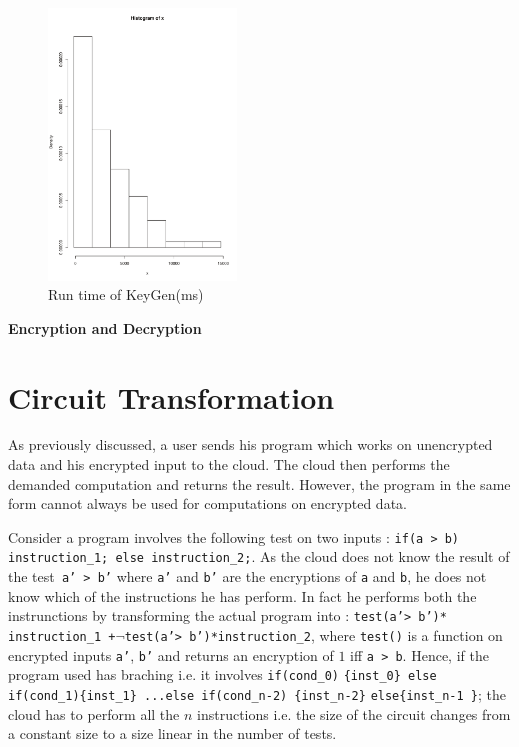 \documentclass{acm_proc_article-sp}
\begin{document}
\begin{figure}[!h] %
\centering
\includegraphics[width=5cm]{f3.pdf} 
\caption{Run time of KeyGen(ms)} 
\label{fig:image_f2} %
\end{figure}


\textbf{Encryption and Decryption}\\

\section{Circuit Transformation}
As previously discussed, a user sends his program which works on unencrypted data and his encrypted input to the cloud. The cloud then performs the demanded computation and returns the result. However, the program in the same form cannot always be used for computations on encrypted data. 

Consider a program involves the following test on two inputs : \texttt{if(a > b) instruction\_1; else instruction\_2;}. As the cloud does not know the result of the test\texttt{ a' > b'} where \texttt{a'} and \texttt{b'} are the encryptions of \texttt{a} and \texttt{b}, he does not know which of the instructions he has perform. In fact he performs both the instrunctions by transforming the actual program into : \texttt{test(a'> b')*} \texttt{instruction\_1 +}$\neg$\texttt{test(a'> b')*instruction\_2}, where \texttt{test()}  is a function on encrypted inputs \texttt{a'}, \texttt{b'} and returns an encryption of $1$ iff \texttt{a > b}. Hence, if the program used has braching i.e. it involves \texttt{if(cond\_0)} \texttt{\{inst\_0\} else if(cond\_1)\{inst\_1\}}\linebreak \texttt{ ...else if(cond\_n-2) \{inst\_n-2\}} \texttt{else\{inst\_n-1 \}}; the cloud has to perform all the $n$ instructions i.e. the size of the circuit changes from a constant size to a size linear in the number of tests.
\end{document}
